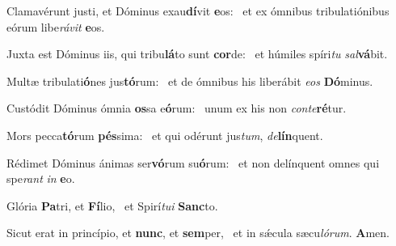 \item Clamavérunt justi, et Dóminus exau\textbf{dí}vit \textbf{e}os:~\psstar{} et ex ómnibus tribulatiónibus eórum libe\textit{rávit} \textbf{e}os.
\item Juxta est Dóminus iis, qui tribu\textbf{lá}to sunt \textbf{cor}de:~\psstar{} et húmiles spíri\textit{tu} \textit{sal}\textbf{vá}bit.
\item Multæ tribulati\textbf{ó}nes jus\textbf{tó}\-rum:~\psstar{} et de ómnibus his liberábit \textit{eos} \textbf{Dó}minus.
\item Custódit Dóminus ómnia \textbf{os}sa e\textbf{ó}rum:~\psstar{} unum ex his non \textit{conte}\textbf{ré}tur.
\item Mors pecca\textbf{tó}rum \textbf{pés}sima:~\psstar{} et qui odérunt jus\textit{tum}, \textit{de}\textbf{lín}quent.
\item Rédimet Dóminus ánimas ser\textbf{vó}rum su\textbf{ó}rum:~\psstar{} et non delínquent omnes qui spe\textit{rant} \textit{in} \textbf{e}o.
\item Glória \textbf{Pa}tri, et \textbf{Fí}lio,~\psstar{} et Spirí\textit{tui} \textbf{Sanc}to.
\item Sicut erat in princípio, et \textbf{nunc}, et \textbf{sem}per,~\psstar{} et in sǽcula sæcu\textit{lórum}. \textbf{A}men.